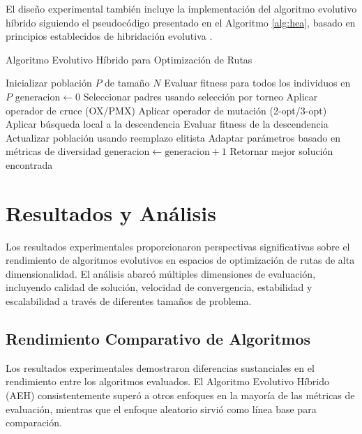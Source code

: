 \documentclass[10pt,a4paper]{article}
\begin{document}
El diseño experimental también incluye la implementación del algoritmo evolutivo híbrido siguiendo el pseudocódigo presentado en el Algoritmo \ref{alg:hea}, basado en principios establecidos de hibridación evolutiva \cite{alba2013}.

\begin{algorithm}[H]
\caption{Algoritmo Evolutivo Híbrido para Optimización de Rutas}
\label{alg:hea}
\begin{algorithmic}[1]
\STATE Inicializar población $P$ de tamaño $N$
\STATE Evaluar fitness para todos los individuos en $P$
\STATE $\text{generacion} \leftarrow 0$
    \STATE Seleccionar padres usando selección por torneo
    \STATE Aplicar operador de cruce (OX/PMX)
    \STATE Aplicar operador de mutación (2-opt/3-opt)
    \STATE Aplicar búsqueda local a la descendencia
    \STATE Evaluar fitness de la descendencia
    \STATE Actualizar población usando reemplazo elitista
    \STATE Adaptar parámetros basado en métricas de diversidad
    \STATE $\text{generacion} \leftarrow \text{generacion} + 1$
\ENDWHILE
\STATE Retornar mejor solución encontrada
\end{algorithmic}
\end{algorithm}


\section{Resultados y Análisis}

Los resultados experimentales proporcionaron perspectivas significativas sobre el rendimiento de algoritmos evolutivos en espacios de optimización de rutas de alta dimensionalidad. El análisis abarcó múltiples dimensiones de evaluación, incluyendo calidad de solución, velocidad de convergencia, estabilidad y escalabilidad a través de diferentes tamaños de problema.

\subsection{Rendimiento Comparativo de Algoritmos}

Los resultados experimentales demostraron diferencias sustanciales en el rendimiento entre los algoritmos evaluados. El Algoritmo Evolutivo Híbrido (AEH) consistentemente superó a otros enfoques en la mayoría de las métricas de evaluación, mientras que el enfoque aleatorio sirvió como línea base para comparación.
\end{document}
